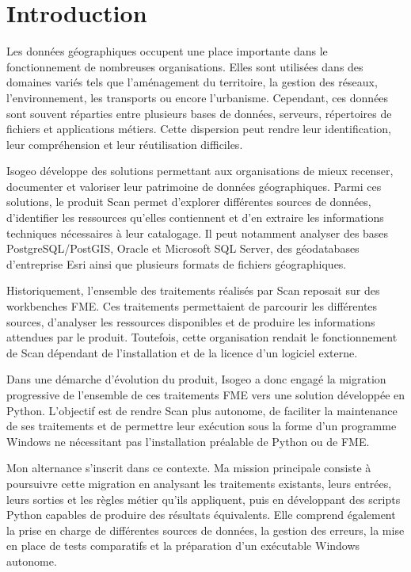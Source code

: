 
\chapter*{Introduction}

Les données géographiques occupent une place importante dans le fonctionnement
de nombreuses organisations. Elles sont utilisées dans des domaines variés tels
que l'aménagement du territoire, la gestion des réseaux, l'environnement, les
transports ou encore l'urbanisme. Cependant, ces données sont souvent réparties
entre plusieurs bases de données, serveurs, répertoires de fichiers et
applications métiers. Cette dispersion peut rendre leur identification, leur
compréhension et leur réutilisation difficiles.

Isogeo développe des solutions permettant aux organisations de mieux recenser,
documenter et valoriser leur patrimoine de données géographiques. Parmi ces
solutions, le produit Scan permet d'explorer différentes sources de données,
d'identifier les ressources qu'elles contiennent et d'en extraire les
informations techniques nécessaires à leur catalogage. Il peut notamment
analyser des bases PostgreSQL/PostGIS, Oracle et Microsoft SQL Server, des
géodatabases d'entreprise Esri ainsi que plusieurs formats de fichiers
géographiques.

Historiquement, l'ensemble des traitements réalisés par Scan reposait sur des
workbenches FME. Ces traitements permettaient de parcourir les différentes
sources, d'analyser les ressources disponibles et de produire les informations
attendues par le produit. Toutefois, cette organisation rendait le
fonctionnement de Scan dépendant de l'installation et de la licence d'un
logiciel externe.

Dans une démarche d'évolution du produit, Isogeo a donc engagé la migration
progressive de l'ensemble de ces traitements FME vers une solution développée
en Python. L'objectif est de rendre Scan plus autonome, de faciliter la
maintenance de ses traitements et de permettre leur exécution sous la forme
d'un programme Windows ne nécessitant pas l'installation préalable de Python ou
de FME.

Mon alternance s'inscrit dans ce contexte. Ma mission principale consiste à
poursuivre cette migration en analysant les traitements existants, leurs
entrées, leurs sorties et les règles métier qu'ils appliquent, puis en
développant des scripts Python capables de produire des résultats équivalents.
Elle comprend également la prise en charge de différentes sources de données,
la gestion des erreurs, la mise en place de tests comparatifs et la préparation
d'un exécutable Windows autonome.

